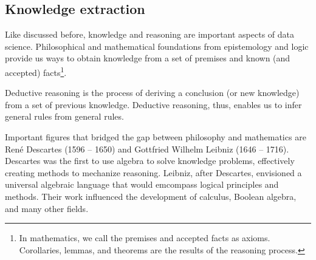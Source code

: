 
\subsection{Knowledge extraction}
\label{sub:knowledge}

Like discussed before, knowledge and reasoning are important aspects of data science.
Philosophical and mathematical foundations from epistemology and logic provide us ways
to obtain knowledge from a set of premises and known (and accepted) facts\footnote{In
mathematics, we call the premises and accepted facts as axioms.  Corollaries,
lemmas, and theorems are the results of the reasoning process.}.

Deductive reasoning is the process of deriving a conclusion (or new knowledge) from
a set of previous knowledge.  Deductive reasoning, thus, enables us to infer general
rules from general rules.

Important figures that bridged the gap between philosophy and mathematics are
René Descartes (1596 -- 1650) and Gottfried Wilhelm Leibniz (1646 -- 1716).  Descartes
was the first to use algebra to solve knowledge problems, effectively creating
methods to mechanize reasoning.  Leibniz, after Descartes, envisioned a universal
algebraic language that would emcompass logical principles and methods. Their work
influenced the development of calculus, Boolean algebra, and many other fields.

